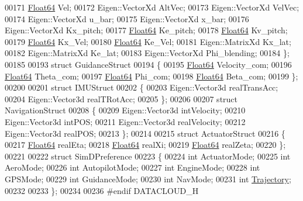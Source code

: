 \begin{DoxyCode}
00171         \hyperlink{group___tools_ga3f1431cb9f76da10f59246d1d743dc2c}{Float64} Vel;
00172         Eigen::VectorXd AltVec;
00173         Eigen::VectorXd VelVec;
00174         Eigen::VectorXd u\_bar;
00175         Eigen::VectorXd x\_bar;
00176         Eigen::VectorXd Kx\_pitch;
00177         \hyperlink{group___tools_ga3f1431cb9f76da10f59246d1d743dc2c}{Float64} Ke\_pitch;
00178         \hyperlink{group___tools_ga3f1431cb9f76da10f59246d1d743dc2c}{Float64} Kv\_pitch;
00179         \hyperlink{group___tools_ga3f1431cb9f76da10f59246d1d743dc2c}{Float64} Kx\_Vel;
00180         \hyperlink{group___tools_ga3f1431cb9f76da10f59246d1d743dc2c}{Float64} Ke\_Vel;
00181         Eigen::MatrixXd Kx\_lat;
00182         Eigen::MatrixXd Ke\_lat;
00183         Eigen::VectorXd Phi\_blending;
00184 \};
00185 
00193 \textcolor{keyword}{struct }GuidanceStruct
00194 \{
00195     \hyperlink{group___tools_ga3f1431cb9f76da10f59246d1d743dc2c}{Float64} Velocity\_com;
00196     \hyperlink{group___tools_ga3f1431cb9f76da10f59246d1d743dc2c}{Float64}  Theta\_com;
00197     \hyperlink{group___tools_ga3f1431cb9f76da10f59246d1d743dc2c}{Float64} Phi\_com;
00198     \hyperlink{group___tools_ga3f1431cb9f76da10f59246d1d743dc2c}{Float64} Beta\_com;
00199 \};
00200 
00201 \textcolor{keyword}{struct }IMUStruct
00202 \{
00203     Eigen::Vector3d realTransAcc;
00204     Eigen::Vector3d realTRotAcc;
00205 \};
00206 
00207 \textcolor{keyword}{struct }NavigationStruct
00208 \{
00209     Eigen::Vector3d intVelocity;
00210     Eigen::Vector3d intPOS;
00211     Eigen::Vector3d realVelocity;
00212     Eigen::Vector3d realPOS;
00213 \};
00214 
00215 \textcolor{keyword}{struct }ActuatorStruct
00216 \{
00217     \hyperlink{group___tools_ga3f1431cb9f76da10f59246d1d743dc2c}{Float64} realEta;
00218     \hyperlink{group___tools_ga3f1431cb9f76da10f59246d1d743dc2c}{Float64} realXi;
00219     \hyperlink{group___tools_ga3f1431cb9f76da10f59246d1d743dc2c}{Float64} realZeta;
00220 \};
00221 
00222 \textcolor{keyword}{struct }SimDPreference
00223 \{
00224     \textcolor{keywordtype}{int} ActuatorMode;
00225     \textcolor{keywordtype}{int} AeroMode;
00226     \textcolor{keywordtype}{int} AutopilotMode;
00227     \textcolor{keywordtype}{int} EngineMode;
00228     \textcolor{keywordtype}{int} GPSMode;
00229     \textcolor{keywordtype}{int} GuidanceMode;
00230     \textcolor{keywordtype}{int} NavMode;
00231     \textcolor{keywordtype}{int} \hyperlink{group___trajectory_class_trajectory}{Trajectory};
00232 
00233 \};
00234 
00236 \textcolor{preprocessor}{#endif  DATACLOUD\_H}
\end{DoxyCode}
